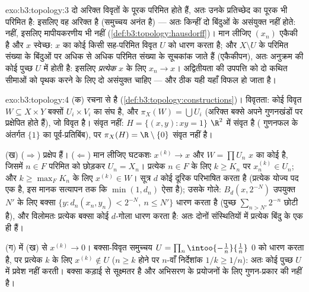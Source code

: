 \begin{solution}{exo:b3:topology:3}
दो अरिक्त विवृतों के पूरक परिमित होते हैं, अतः उनके प्रतिच्छेद का
पूरक भी परिमित है: इसलिए वह अरिक्त है (समुच्चय अनंत है) --- अतः
किन्हीं दो बिंदुओं के असंयुक्त  नहीं होते:  नहीं,
इसलिए मापीयकरणीय भी नहीं (\cref{def:b3:topology:hausdorff})। मान लीजिए $(x_n)$ एकैकी है और $x$
स्वेच्छ: $x$ का कोई  किसी सह-परिमित विवृत $U$ को धारण
करता है; और $X\setminus U$ के परिमित संख्या के बिंदुओं पर अधिक से अधिक परिमित
संख्या के सूचकांक जाते हैं (एकैकीपन), अतः अनुक्रम की कोई पुच्छ $U$
में होती है: इसलिए \emph{प्रत्येक} $x$ के लिए $x_n \to x$। अद्वितीयता की
उपपत्ति को दो कथित सीमाओं को पृथक करने के लिए दो असंयुक्त 
चाहिए --- और ठीक यही यहाँ विफल हो जाता है।
\end{solution}

\begin{solution}{exo:b3:topology:4}
(क)  रचना से है (\cref{def:b3:topology:constructions})। विवृतता: कोई विवृत $W
\subseteq X \times Y$ बक्सों $U_i\times V_i$
का संघ है, और $\pi_X(W) = \bigcup U_i$ (अरिक्त बक्से अपने गुणनखंडों पर प्रक्षेपित होते
हैं), जो विवृत है। संवृत नहीं: $H = \{(x,y) : xy = 1\}$ $\R^2$ में संवृत है ( गुणनफल
के अंतर्गत $\{1\}$ का पूर्व-प्रतिबिंब), पर $\pi_X(H) = \R\setminus\{0\}$ संवृत नहीं है।

(ख) ($\Rightarrow$) प्रक्षेप  हैं। ($\Leftarrow$) मान लीजिए घटकशः $x^{(k)} \to x$ और $W = \prod U_n$
$x$ का कोई   है, जिसमें $n \in F$ परिमित को छोड़कर $U_n = X_n$।
प्रत्येक $n \in F$ के लिए $k \geq
K_n$ पर $x_n^{(k)} \in U_n$; और $k \geq \max_F K_n$ के लिए $x^{(k)} \in W$। सूत्र $d$
कोई दूरिक परिभाषित करता है (प्रत्येक योज्य पद एक है, इस मानक सत्यापन
तक कि $\min(1, d_n)$ ऐसा है); उसके गोले: $B_d(x,
2^{-N})$ उपयुक्त $N'$ के लिए  बक्सा
$\{y : d_n(x_n,y_n) < 2^{-N},\
n \leq N'\}$ धारण करता है (पुच्छ $\sum_{n > N'} 2^{-n}$ छोटी है), और विलोमतः प्रत्येक 
बक्सा कोई $d$-गोला धारण करता है: अतः दोनों संस्थितियों में प्रत्येक
बिंदु के \omterm{def:b3:topology:topology}{प्रतिवेश} एक ही हैं।

(ग)  में (ख) से $x^{(k)} \to 0$। बक्सा-विवृत समुच्चय $U = \prod_n \intoo{-\tfrac1n}{\tfrac1n}$ $0$
को धारण करता है, पर प्रत्येक $k$ के लिए $x^{(k)} \notin U$ ($n \geq k$ होने पर $n$-वाँ
निर्देशांक $1/k
\geq 1/n$): अतः कोई पुच्छ $U$ में प्रवेश नहीं करती। बक्सा
 कड़ाई से सूक्ष्मतर है और अभिसरण के प्रयोजनों के लिए गुणन-प्रकार
की \omterm{def:b3:topology:topology}{संस्थिति} नहीं है।
\end{solution}

